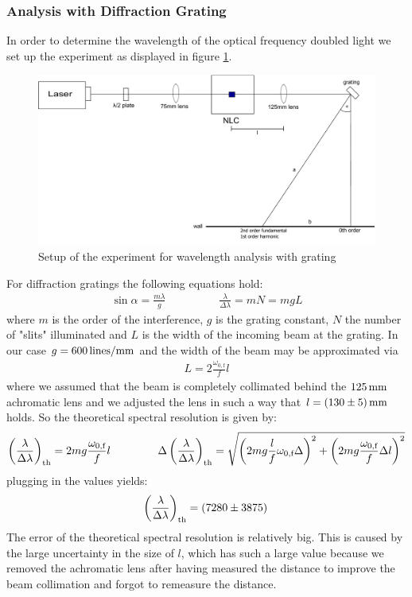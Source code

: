 \documentclass{protokoll_en}
\begin{document}
\subsubsection{Analysis with Diffraction Grating}
\label{subsubsec:ana_grating}
In order to determine the wavelength of the optical frequency doubled light we set up the experiment as displayed in figure \ref{fig:setup_grating}.
\begin{figure}[H]
  \centering
  \includegraphics[width=1.0\textwidth]{graphics/setup_grating}
  \caption{Setup of the experiment for wavelength analysis with grating}
  \label{fig:setup_grating}
\end{figure}
For diffraction gratings the following equations hold:
\begin{align*}
\sin \alpha = \frac{m\lambda}{g} \hspace{2cm} \frac{\lambda}{\Delta \lambda} = mN = mg L
\end{align*}
where $m$ is the order of the interference, $g$ is the grating constant, $N$ the number of "slits" illuminated and $L$ is the width of the incoming beam at the grating. In our case $g = \unit[600]{lines/mm}$ and the width of the beam may be approximated via
\begin{align*}
L = 2\frac{\omega_{0,\textrm{f}}}{f}l
\end{align*}
where we assumed that the beam is completely collimated behind the $\unit[125]{mm}$ achromatic lens and we adjusted the lens in such a way that $l = \unit[(130 \pm 5)]{mm}$ holds. So the theoretical spectral resolution is given by:
\begin{align}
\left(\frac{\lambda}{\Delta\lambda}\right)_\textrm{th} = 2mg\frac{\omega_{0,\textrm{f}}}{f}l \hspace{1.5cm} \Delta\left(\frac{\lambda}{\Delta\lambda}\right)_\textrm{th} = \sqrt{\left(2mg\frac{l}{f}\omega_{0,\textrm{f}}\Delta \right)^2+\left(2mg\frac{\omega_{0,\textrm{f}}}{f}\Delta l\right)^2}
\end{align}
plugging in the values yields:
\begin{align}
\left(\frac{\lambda}{\Delta\lambda}\right)_\textrm{th} = \unit[(7280 \pm 3875)]{}
\end{align}
The error of the theoretical spectral resolution is relatively big. This is caused by the large uncertainty in the size of $l$, which has such a large value because we removed the achromatic lens after having measured the distance to improve the beam collimation and forgot to remeasure the distance.
\end{document}
